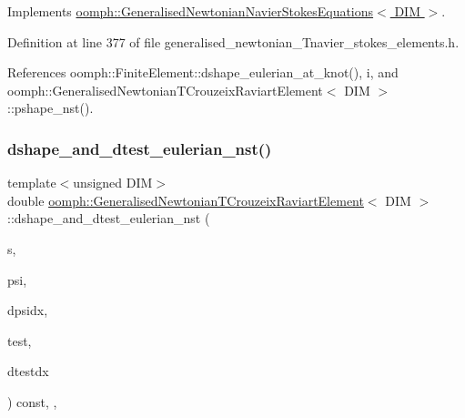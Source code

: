 Implements \hyperlink{classoomph_1_1GeneralisedNewtonianNavierStokesEquations_a24a93b73dba66e04eabb9b37a9360daa}{oomph\+::\+Generalised\+Newtonian\+Navier\+Stokes\+Equations$<$ D\+I\+M $>$}.



Definition at line 377 of file generalised\+\_\+newtonian\+\_\+\+Tnavier\+\_\+stokes\+\_\+elements.\+h.



References oomph\+::\+Finite\+Element\+::dshape\+\_\+eulerian\+\_\+at\+\_\+knot(), i, and oomph\+::\+Generalised\+Newtonian\+T\+Crouzeix\+Raviart\+Element$<$ D\+I\+M $>$\+::pshape\+\_\+nst().

\mbox{\label{classoomph_1_1GeneralisedNewtonianTCrouzeixRaviartElement_a772e1572fb598a309aaf35b5991d66c3}} 
\subsubsection{\texorpdfstring{dshape\+\_\+and\+\_\+dtest\+\_\+eulerian\+\_\+nst()}{dshape\_and\_dtest\_eulerian\_nst()}}
{\footnotesize\ttfamily template$<$unsigned D\+IM$>$ \\
double \hyperlink{classoomph_1_1GeneralisedNewtonianTCrouzeixRaviartElement}{oomph\+::\+Generalised\+Newtonian\+T\+Crouzeix\+Raviart\+Element}$<$ D\+IM $>$\+::dshape\+\_\+and\+\_\+dtest\+\_\+eulerian\+\_\+nst (\begin{DoxyParamCaption}\item[{const \hyperlink{classoomph_1_1Vector}{Vector}$<$ double $>$ \&}]{s,  }\item[{\hyperlink{classoomph_1_1Shape}{Shape} \&}]{psi,  }\item[{\hyperlink{classoomph_1_1DShape}{D\+Shape} \&}]{dpsidx,  }\item[{\hyperlink{classoomph_1_1Shape}{Shape} \&}]{test,  }\item[{\hyperlink{classoomph_1_1DShape}{D\+Shape} \&}]{dtestdx }\end{DoxyParamCaption}) const\hspace{0.3cm}{\ttfamily [inline]}, {\ttfamily [protected]}, {\ttfamily [virtual]}}




